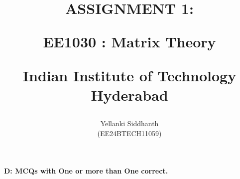\documentclass[journal]{IEEEtran}
\begin{document}

\onecolumn
\title{
ASSIGNMENT 1:

\large{EE1030 : Matrix Theory}

Indian Institute of Technology Hyderabad
}
\author{Yellanki Siddhanth

(EE24BTECH11059)
}	




\maketitle





\bigskip

\renewcommand{\thefigure}{\theenumi}
\renewcommand{\thetable}{\theenumi}
 
    
        \textbf{D: MCQs with One or more than One correct.}
    
\end{document}
